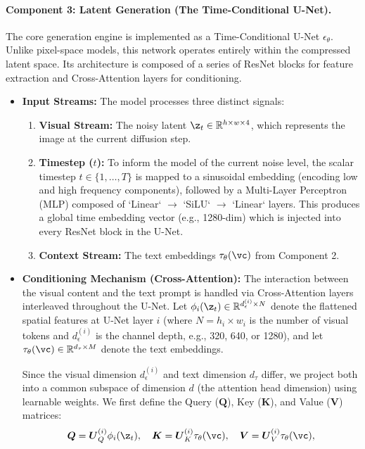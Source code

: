 \documentclass[../../book-main.tex]{subfiles}
\begin{document}
\paragraph{Component 3: Latent Generation (The Time-Conditional U-Net).}
The core generation engine is implemented as a Time-Conditional U-Net
$\epsilon_\theta$. Unlike pixel-space models, this network operates
entirely within the compressed latent space. Its architecture is
composed of a series of ResNet blocks for feature extraction and
Cross-Attention layers for conditioning.
\begin{itemize}
\item \textbf{Input Streams:} The model processes three distinct signals:
    \begin{enumerate}
        \item \textbf{Visual Stream:} The noisy latent $\z_t \in
            \mathbb{R}^{h \times w \times 4}$, which represents the
            image at the current diffusion step.
        \item \textbf{Timestep ($t$):} To inform the model of the
            current noise level, the scalar timestep $t \in \{1,
            \dots, T\}$ is mapped to a sinusoidal embedding (encoding
            low and high frequency components), followed by a
            Multi-Layer Perceptron (MLP) composed of `Linear` $\to$
            `SiLU` $\to$ `Linear` layers. This produces a global time
            embedding vector (e.g., 1280-dim) which is injected into
            every ResNet block in the U-Net.
        \item \textbf{Context Stream:} The text embeddings
            $\tau_\theta(\vc)$ from Component 2.
    \end{enumerate}

\item \textbf{Conditioning Mechanism (Cross-Attention):} The
    interaction between the visual content and the text prompt is
    handled via Cross-Attention layers interleaved throughout the
    U-Net. Let $\phi_i(\z_t) \in \mathbb{R}^{d_\epsilon^{(i)} \times
    N}$ denote the flattened spatial features at U-Net layer $i$
    (where $N = h_i \times w_i$ is the number of visual tokens and
        $d_\epsilon^{(i)}$ is the channel depth, e.g., 320, 640, or
    1280), and let $\tau_\theta(\vc) \in \mathbb{R}^{d_\tau \times
    M}$ denote the text embeddings.

    Since the visual dimension $d_\epsilon^{(i)}$ and text dimension
    $d_\tau$ differ, we project both into a common subspace of
    dimension $d$ (the attention head dimension) using learnable
    weights. We first define the Query ($\boldsymbol{Q}$), Key
    ($\boldsymbol{K}$), and Value ($\boldsymbol{V}$) matrices:
    \begin{equation}
        \boldsymbol{Q} = \boldsymbol{U}^{(i)}_{Q} \phi_i(\z_t), \quad
        \boldsymbol{K} = \boldsymbol{U}^{(i)}_{K} \tau_\theta(\vc), \quad
        \boldsymbol{V} = \boldsymbol{U}^{(i)}_{V} \tau_\theta(\vc),
    \end{equation}


\end{itemize}
\end{document}
